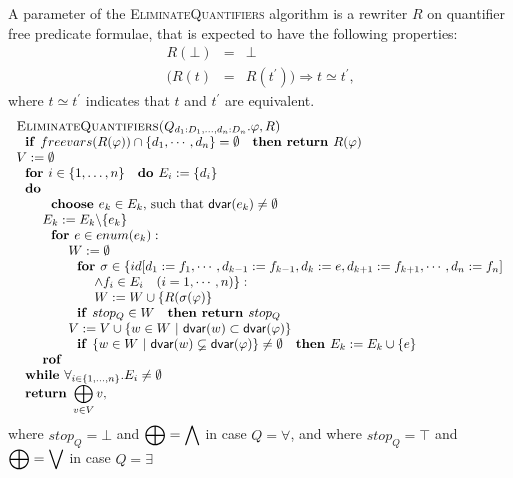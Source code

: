 \documentclass{article}
\begin{document}
A parameter of the \textsc{EliminateQuantifiers }algorithm is a rewriter $R$
on quantifier free predicate formulae, that is expected to have the
following properties:%
\begin{eqnarray*}
R(\bot ) &=&\bot \\
(R(t) &=&R(t^{\prime }))\Rightarrow t\simeq t^{\prime }\text{,}
\end{eqnarray*}%
where $t\simeq t^{\prime }$ indicates that $t$ and $t^{\prime }$ are
equivalent. 
\begin{equation*}
\begin{tabular}{l}
\textsc{EliminateQuantifiers(}$Q_{d_{1}:D_{1},\ldots ,d_{n}:D_{n}}.\varphi
,R $\textsc{)} \\ 
$\text{\textbf{if }}freevars(R(\varphi ))\cap \{d_{1},\cdots
,d_{n}\}=\emptyset $ $\text{\textbf{then return }}R(\varphi )$ \\ 
$V:=\emptyset $ \\ 
$\text{\textbf{for }}i\in \{1,\ldots ,n\}\text{ \textbf{do }}%
E_{i}:=\{d_{i}\} $ \\ 
$\text{\textbf{do}}$ \\ 
$\qquad \text{\textbf{choose }}e_{k}\in E_{k}$, such that $\mathsf{dvar}%
(e_{k})\neq \emptyset $ \\ 
$\qquad E_{k}:=E_{k}\backslash \{e_{k}\}$ \\ 
$\qquad \text{\textbf{for }}e\in enum(e_{k}):$ \\ 
$\qquad \qquad W:=\emptyset $ \\ 
$\qquad \qquad \text{\textbf{for }}\sigma \in \{id[d_{1}:=f_{1},\cdots
,d_{k-1}:=f_{k-1},d_{k}:=e,d_{k+1}:=f_{k+1},\cdots ,d_{n}:=f_{n}]$ \\ 
$\qquad \qquad \qquad \wedge f_{i}\in E_{i}\quad (i=1,\cdots ,n)\}:$ \\ 
$\qquad \qquad \qquad W:=W\cup \{R(\sigma (\varphi )\}$ \\ 
$\qquad \qquad \text{\textbf{if }}stop_{Q}\in W\text{ \textbf{then return }}%
stop_{Q}$ \\ 
$\qquad \qquad V:=V\cup \{w\in W\ |\ \mathsf{dvar}(w)\subset \mathsf{dvar}%
(\varphi )\}$ \\ 
$\qquad \qquad \text{\textbf{if }}\{w\in W\ |\ \mathsf{dvar}(w)\varsubsetneq 
\mathsf{dvar}(\varphi )\}\neq \emptyset $ $\text{\textbf{then }}%
E_{k}:=E_{k}\cup \{e\}$ \\ 
$\qquad $\textbf{rof} \\ 
$\text{\textbf{while }}\forall _{i\in \{1,\ldots ,n\}}.E_{i}\neq \emptyset $
\\ 
$\text{\textbf{return} }\dbigoplus\limits_{v\in V}v,$%
\end{tabular}%
\end{equation*}%
where $stop_{Q}=\bot $ and $\mathop{\displaystyle \bigoplus } =\mathop{\displaystyle \bigwedge } $ in case $Q=\forall $,
and where $stop_{Q}=\top $ and $\mathop{\displaystyle \bigoplus } =\mathop{\displaystyle \bigvee } $ in case $Q=\exists $
\end{document}
